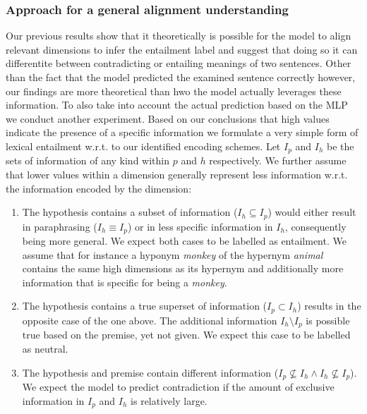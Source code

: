 \subsubsection{Approach for a general alignment understanding}\label{sec:approach_general_alignment_understanding}
Our previous results show that it theoretically is possible for the model  to align relevant dimensions to infer the entailment label and suggest that doing so it can differentite between contradicting or entailing meanings of two sentences. Other than the fact that the model predicted the examined sentence correctly however, our findings are more theoretical than hwo the model actually leverages these information. To also take into account the actual prediction based on the \ac{MLP} we conduct another experiment. Based on our conclusions that high values indicate the presence of a specific information we formulate a very simple form of lexical entailment w.r.t. to our identified encoding schemes. Let $I_p$ and $I_h$ be the sets of information of any kind within $p$ and $h$ respectively. We further assume that lower values within a dimension generally represent less information w.r.t. the information encoded by the dimension:
\begin{enumerate}
\item The hypothesis contains a subset of information ($I_h \subseteq I_p$) would either result in paraphrasing ($I_h \equiv I_p$) or in less specific information in $I_h$, consequently being more general. We expect both cases to be labelled as entailment. We assume that for instance a hyponym \textit{monkey} of the hypernym \textit{animal} contains the same high dimensions as its hypernym and additionally more information that is specific for being a \textit{monkey}.
\item The hypothesis contains a true superset of information ($I_p \subset I_h$) results in the opposite case of the one above. The additional information $I_h \setminus I_p$ is possible true based on the premise, yet not given. We expect this case to be labelled as neutral.
\item The hypothesis and premise contain different information ($I_p \nsubseteq I_h \land I_h \nsubseteq I_p$). We expect the model to predict contradiction if the amount of exclusive information in $I_p$ and $I_h$ is relatively large.
\end{enumerate}

